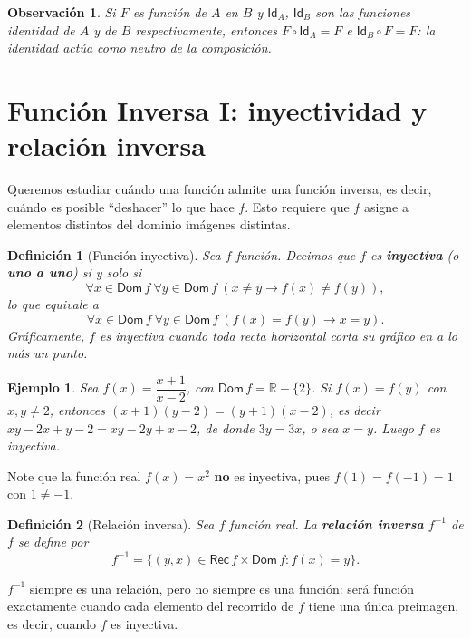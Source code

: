 \documentclass[11pt]{article}
\newtheorem{definicion}{Definición}
\newtheorem{ejemplo}{Ejemplo}
\newtheorem{observacion}{Observación}
\begin{document}
\begin{observacion}
Si $F$ es función de $A$ en $B$ y $\mathsf{Id}_A$, $\mathsf{Id}_B$ son las funciones identidad de
$A$ y de $B$ respectivamente, entonces $F \circ \mathsf{Id}_A = F$ e $\mathsf{Id}_B \circ F = F$: la
identidad actúa como neutro de la composición.
\end{observacion}

\section{Función Inversa I: inyectividad y relación inversa}

Queremos estudiar cuándo una función admite una función inversa, es decir, cuándo es posible
``deshacer'' lo que hace $f$. Esto requiere que $f$ asigne a elementos distintos del dominio
imágenes distintas.

\begin{definicion}[Función inyectiva]
Sea $f$ función. Decimos que $f$ es \textbf{inyectiva} (o \textbf{uno a uno}) si y solo si
$$\forall x \in \mathsf{Dom}\,f\ \forall y \in \mathsf{Dom}\,f\ (x \neq y \rightarrow f(x) \neq f(y)),$$
lo que equivale a
$$\forall x \in \mathsf{Dom}\,f\ \forall y \in \mathsf{Dom}\,f\ (f(x) = f(y) \rightarrow x = y).$$
Gráficamente, $f$ es inyectiva cuando toda recta horizontal corta su gráfico en a lo más un punto.
\end{definicion}

\begin{ejemplo}
Sea $f(x) = \dfrac{x+1}{x-2}$, con $\mathsf{Dom}\,f = \mathbb{R}-\{2\}$. Si $f(x) = f(y)$ con
$x,y \neq 2$, entonces $(x+1)(y-2) = (y+1)(x-2)$, es decir $xy - 2x + y - 2 = xy - 2y + x - 2$, de
donde $3y = 3x$, o sea $x=y$. Luego $f$ es inyectiva.
\end{ejemplo}

Note que la función real $f(x)=x^2$ \textbf{no} es inyectiva, pues $f(1)=f(-1)=1$ con $1 \neq -1$.

\begin{definicion}[Relación inversa]
Sea $f$ función real. La \textbf{relación inversa} $f^{-1}$ de $f$ se define por
$$f^{-1} = \{(y,x) \in \mathsf{Rec}\,f \times \mathsf{Dom}\,f : f(x) = y\}.$$
\end{definicion}

$f^{-1}$ siempre es una relación, pero no siempre es una función: será función exactamente cuando
cada elemento del recorrido de $f$ tiene una única preimagen, es decir, cuando $f$ es inyectiva.
\end{document}
